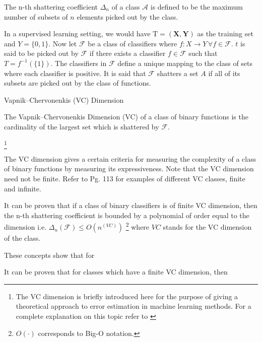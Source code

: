 The n-th shattering coefficient $\Delta_n$ of a class $\mathcal {A}$ is defined to be the maximum number of subsets of $n$ elements picked out by the class. 

In a supervised learning setting, we would have $\mathrm{T} = (\textbf{X},\textbf{Y})$ as the training set and $Y = \{0,1 \}$. Now let $\mathcal {F}$ be a class of classifiers where $f: X \rightarrow Y \, \forall f \in \mathcal {F}$. $t$ is said to be picked out by $\mathcal {F}$ if there exists a classifier $f \in \mathcal {F}$ such that $T = f^{-1}(\{1\})$. The classifiers in $\mathcal {F}$ define a unique mapping to the class of sets where each classifier is positive. It is said that $\mathcal {F}$ shatters a set $A$ if all of its subsets are picked out by the class of functions.

\begin{definition}{Vapnik–Chervonenkis (VC) Dimension}
 	
The Vapnik–Chervonenkis Dimension (VC) of a class of binary functions is the cardinality of the largest set which is shattered by $\mathcal {F}$.
\end{definition}\footnote{The VC dimension is briefly introduced here for the purpose of giving a theoretical approach to error estimation in machine learning methods. For a complete explanation on this topic refer to \cite{vapnik-nature2013}}

The VC dimension gives a certain criteria for measuring the complexity of a class of binary functions by measuring its expressiveness. Note that the VC dimension need not be finite. Refer to \cite{cherkassky-learning2007} Pg. 113 for examples of different VC classes, finite and infinite.

It can be proven that if a class of binary classifiers is of finite VC dimension, then the n-th shattering coefficient is bounded by a polynomial of order equal to the dimension 
i.e. $\Delta_n(\mathcal {F}) \leq O(n^(VC))$ \footnote{$O(\cdot)$ corresponds to Big-O notation.} where $VC$ stands for the VC dimension of the class.

These concepts show that for

It can be proven that for classes which have a finite VC dimension, then

